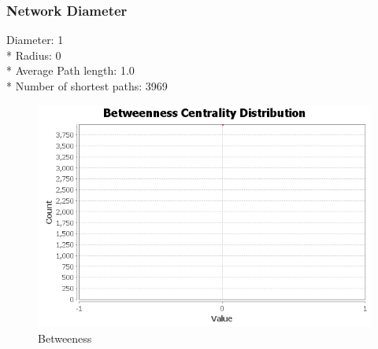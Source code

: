 \documentclass[12pt]{article}
\begin{document}
\subsubsection{Network Diameter}
Diameter: 1\\*
Radius: 0\\*
Average Path length: 1.0\\*
Number of shortest paths: 3969
\begin{figure}[!ht]
\includegraphics[scale=0.7]{../Q3/network/BetweennessCentralityDistribution}
\centering
\caption{Betweeness}
\end{figure}
\end{document}
